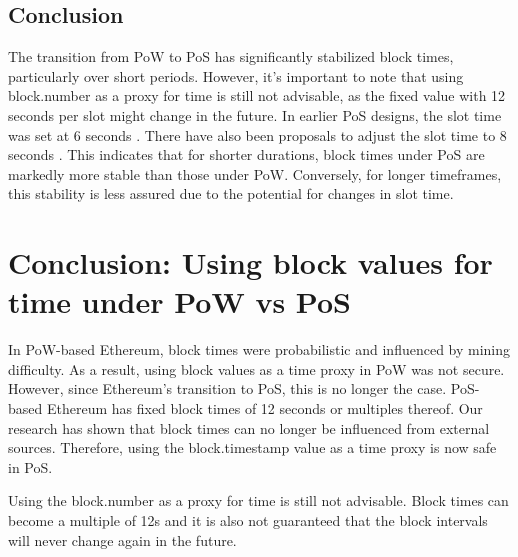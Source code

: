 \subsection{Conclusion}
The transition from PoW to PoS has significantly stabilized block times,
particularly over short periods. However, it's important to note that using
block.number as a proxy for time is still not advisable, as the fixed value
with 
12 seconds per slot might change in the future. In earlier PoS designs, the
slot time was set at 6 seconds \cite{block_time_6_to_12_sec}. There have
also been proposals to adjust the slot time to 8 seconds
\cite{proposed_block_time_8_seconds}. This indicates that for shorter
durations, block times under PoS are markedly more stable than those under
PoW. Conversely, for longer timeframes, this stability is less assured due
to the potential for changes in slot time.


\section{Conclusion: Using block values for time under PoW vs PoS}



In PoW-based Ethereum, block times were probabilistic and influenced by mining difficulty.
As a result, using block values as a time proxy in PoW was not secure.
However, since Ethereum's transition to PoS, this is no longer the case.
PoS-based Ethereum has fixed block times of 12 seconds or multiples thereof.
Our research has shown that block times can no longer be influenced from external sources.
Therefore, using the block.timestamp value as a time proxy is now safe in PoS.

Using the block.number as a proxy for time is still not advisable. Block times 
can become a multiple of 12s and it is also not guaranteed that the block intervals will
never change again in the future.
